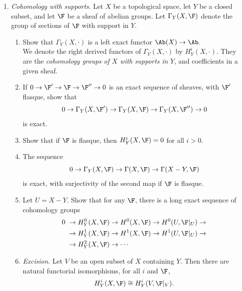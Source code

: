 \documentclass[12pt]{amsart}
\begin{document}
\begin{enumerate}
  \item[2.3.] {
      \emph{Cohomology with supports}.
      Let $X$ be a topological space, let $Y$ be a closed subset, and let $\F$ be a sheaf of abelian groups.
      Let $\Gamma_Y(X,\F)$ denote the group of sections  of $\F$ with support in $Y$.
      \begin{enumerate}
        \item Show that $\Gamma_Y(X,\cdot)$ is a left exact functor $\Ab(X)\to \Ab$.
          \\ We denote the right derived functors of $\Gamma_Y(X,\cdot)$ by $H_Y^i(X,\cdot)$.
          They are the \emph{cohomology groups of $X$ with supports in $Y$}, and coefficients in a given sheaf.
        \item If $0\to \F'\to\F\to\F''\to 0$ is an exact sequence of sheaves, with $\F'$ flasque, show that
          \[
            0\to \Gamma_Y(X,\F')\to \Gamma_Y(X,\F)\to \Gamma_Y(X,\F'')\to 0
          \] 
          is exact.
        \item Show that if $\F$ is flasque, then $H_Y^i(X,\F)=0$ for all $i>0$.
        \item The sequence
          \[
            0\to \Gamma_Y(X,\F)\to \Gamma(X,\F)\to \Gamma(X-Y,\F)
          \] 
          is exact, with surjectivity of the second map if $\F$ is flasque.
        \item Let $U=X-Y$.
          Show that for any $\F$, there is a long exact sequence of cohomology groups
          \begin{align*}
            0\; &\to H_Y^0(X,\F)\to H^0(X,\F)\to H^0(U,\F|_U)\to \\
                &\to H_Y^1(X,\F)\to H^1(X,\F)\to H^1(U,\F|_U)\to  \\
                &\to H_Y^2(X,\F)\to \cdots
          \end{align*}
        \item \emph{Excision.} Let $V$ be an open subset of $X$ containing $Y$.
          Then there are natural functorial isomorphisms, for all $i$ and $\F$,
          \[
            H_Y^i(X,\F)\cong H_Y^i(V,\F|_V).
          \] 
      \end{enumerate}
    }
\end{enumerate}
\end{document}
